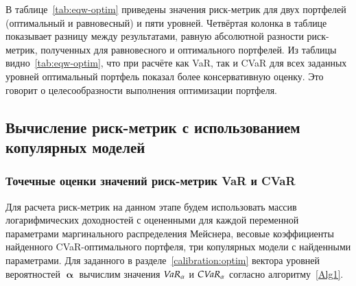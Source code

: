 В таблице~\ref{tab:eqw-optim} приведены значения риск-метрик для двух портфелей (оптимальный и равновесный) и пяти уровней. 
Четвёртая колонка в таблице показывает разницу между результатами, равную абсолютной разности риск-метрик, полученных для равновесного и оптимального портфелей. 
Из таблицы видно~\ref{tab:eqw-optim}, что при расчёте как VaR, так и CVaR для всех заданных уровней оптимальный портфель показал более консервативную оценку.
Это говорит о целесообразности выполнения оптимизации портфеля.

\subsection{Вычисление риск-метрик с использованием копулярных моделей}
\label{results:risk-measures}


\subsubsection{Точечные оценки значений риск-метрик VaR и CVaR}

Для расчета риск-метрик на данном этапе будем использовать массив логарифмических доходностей с оцененными  для каждой переменной параметрами маргинального распределения Мейснера, весовые коэффициенты найденного CVaR-оптимального портфеля, три копулярных модели с найденными параметрами.
Для заданного в разделе~\ref{calibration:optim} вектора уровней вероятностей $\pmb{\upalpha}$ вычислим значения $\emph{VaR}_\alpha$ и $\emph{CVaR}_\alpha$ согласно алгоритму~\ref{Alg1}.

